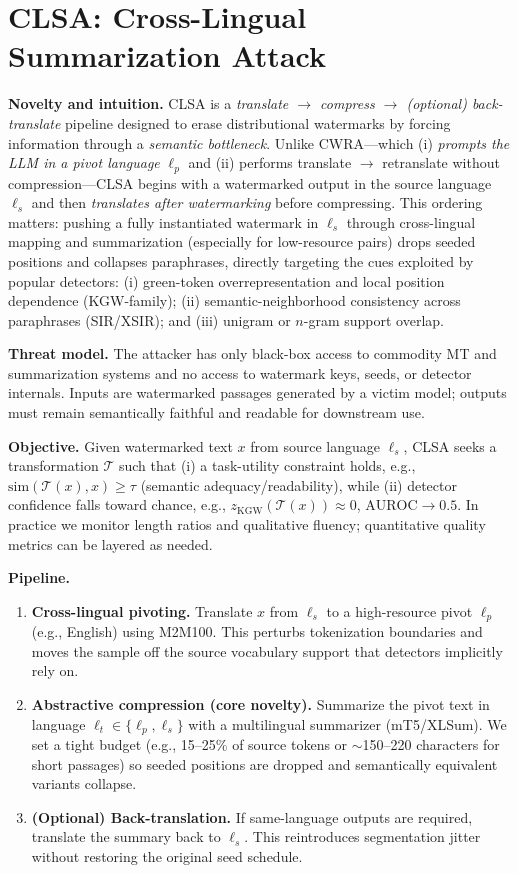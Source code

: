 \documentclass{article}
\begin{document}
\section{CLSA: Cross-Lingual Summarization Attack}

\textbf{Novelty and intuition.}
CLSA is a \emph{translate $\rightarrow$ compress $\rightarrow$ (optional) back-translate} pipeline designed to erase distributional watermarks by forcing information through a \emph{semantic bottleneck}. Unlike CWRA—which (i) \emph{prompts the LLM in a pivot language} $\ell_p$ and (ii) performs translate $\rightarrow$ retranslate without compression—CLSA begins with a watermarked output in the source language $\ell_s$ and then \emph{translates after watermarking} before compressing. This ordering matters: pushing a fully instantiated watermark in $\ell_s$ through cross-lingual mapping and summarization (especially for low-resource pairs) drops seeded positions and collapses paraphrases, directly targeting the cues exploited by popular detectors: (i) green-token overrepresentation and local position dependence (KGW-family); (ii) semantic-neighborhood consistency across paraphrases (SIR/XSIR); and (iii) unigram or $n$-gram support overlap.

\textbf{Threat model.}
The attacker has only black-box access to commodity MT and summarization systems and no access to watermark keys, seeds, or detector internals. Inputs are watermarked passages generated by a victim model; outputs must remain semantically faithful and readable for downstream use.

\textbf{Objective.}
Given watermarked text $x$ from source language $\ell_s$, CLSA seeks a transformation $\mathcal{T}$ such that (i) a task-utility constraint holds, e.g., $\mathrm{sim}(\mathcal{T}(x), x) \ge \tau$ (semantic adequacy/readability), while (ii) detector confidence falls toward chance, e.g., $z_{\mathrm{KGW}}(\mathcal{T}(x)) \approx 0$, $\mathrm{AUROC} \rightarrow 0.5$. In practice we monitor length ratios and qualitative fluency; quantitative quality metrics can be layered as needed.

\textbf{Pipeline.}
\begin{enumerate}
    \item \textbf{Cross-lingual pivoting.} Translate $x$ from $\ell_s$ to a high-resource pivot $\ell_p$ (e.g., English) using M2M100. This perturbs tokenization boundaries and moves the sample off the source vocabulary support that detectors implicitly rely on.
    \item \textbf{Abstractive compression (core novelty).} Summarize the pivot text in language $\ell_t\!\in\!\{\ell_p,\ell_s\}$ with a multilingual summarizer (mT5/XLSum). We set a tight budget (e.g., 15--25\% of source tokens or $\sim$150--220 characters for short passages) so seeded positions are dropped and semantically equivalent variants collapse.
    \item \textbf{(Optional) Back-translation.} If same-language outputs are required, translate the summary back to $\ell_s$. This reintroduces segmentation jitter without restoring the original seed schedule.
\end{enumerate}
\end{document}
